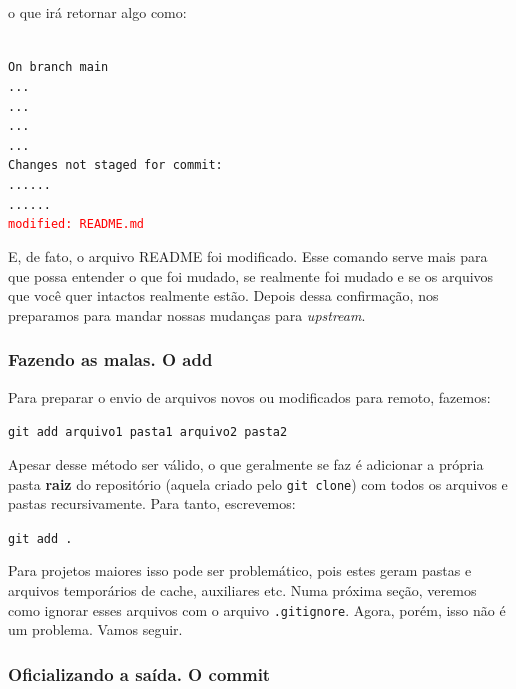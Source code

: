 \documentclass{article}
\begin{document}
  o que irá retornar algo como: 

  \vspace{1ex}
  \texttt{\\
  \noindent On branch main\\
  \noindent ...\\
  \noindent ...\\
  \noindent ...\\
  \noindent ...\\
  \noindent Changes not staged for commit:\\
  \noindent ......\\
  \noindent ......\\
  \noindent \textcolor{red}{modified:   README.md}}
  \vspace{1ex}


  E, de fato, o arquivo README foi modificado. Esse comando serve mais para que possa entender o que foi mudado, se realmente foi 
  mudado e se os arquivos que você quer intactos realmente estão. Depois dessa confirmação, nos preparamos para mandar nossas
  mudanças para \textit{upstream}. 
  
  \subsubsection{Fazendo as malas. O add}
  \label{sec:add}

  Para preparar o envio de arquivos novos ou modificados para remoto, fazemos: 
  
  \vspace{1ex}
  \texttt{git add arquivo1 pasta1 arquivo2 pasta2}
  \vspace{1ex}
  
  Apesar desse método ser válido, o que geralmente se faz é adicionar a própria pasta \textbf{raiz} do repositório (aquela criado pelo \texttt{git clone})
  com todos os arquivos e pastas recursivamente. Para tanto, escrevemos: 

  \vspace{1ex}
  \texttt{git add .}
  \vspace{1ex}

  Para projetos maiores isso pode ser problemático, pois estes geram pastas e arquivos temporários de cache, auxiliares etc. Numa próxima
  seção, veremos como ignorar esses arquivos com o arquivo \texttt{.gitignore}. Agora, porém, isso não é um problema. 
  Vamos seguir. 

  \subsubsection{Oficializando a saída. O commit}
\end{document}
